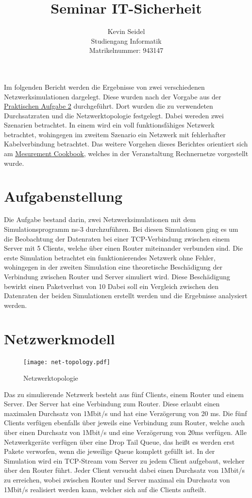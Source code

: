 \documentclass[a4paper, 12pt]{scrartcl}
\title{Seminar IT-Sicherheit}
\author{Kevin Seidel \\ Studiengang Informatik \\ Matrikelnummer: 943147}
\begin{document}
\setcounter{page}{1}

Im folgenden Bericht werden die Ergebnisse von zwei verschiedenen Netzwerksimulationen dargelegt. Diese wurden nach der Vorgabe aus der {\color{blue}\uline{ \href{http://sys.cs.uos.de/lehre/rene/2013/aufgaben/PA_Blatt02.pdf}{Praktischen Aufgabe 2}}} durchgeführt. Dort wurden die zu verwendeten Durchsatzraten und die Netzwerktopologie festgelegt.
Dabei wereden zwei Szenarien betrachtet. In einem wird ein voll funktionsfähiges Netzwerk betrachtet, wohingegen im zweitem Szenario ein Netzwerk mit fehlerhafter Kabelverbindung betrachtet.
Das weitere Vorgehen dieses Berichtes orientiert sich am {\color{blue}\uline{ \href{http://sys.cs.uos.de/lehre/rene/2013/folien/Kap3-Messungen.pdf}{ Mesurement Cookbook}}}, welches in der Veranstaltung Rechnernetze vorgestellt wurde.

\section{Aufgabenstellung}
Die Aufgabe bestand darin, zwei Netzwerksimulationen mit dem Simulationsprogramm ns-3 durchzuführen. Bei diesen Simulationen ging es um die Beobachtung der Datenraten bei einer TCP-Verbindung zwischen einem Server mit 5 Clients, welche über einen Router miteinander verbunden sind.
Die erste Simulation betrachtet ein funktionierendes Netzwerk ohne Fehler, wohingegen in der zweiten Simulation eine theoretische Beschädigung der Verbindung zwischen Router und Server simuliert wird. Diese Beschädigung bewirkt einen Paketverlust von 10%
Dabei soll ein Vergleich zwischen den Datenraten der beiden Simulationen erstellt werden und die Ergebnisse analysiert werden.

\section{Netzwerkmodell}
\begin{figure}[htbp]
	\centering
    \texttt{[image: net-topology.pdf]}
  \caption{Netzwerktopologie}
  \label{Labelname}
\end{figure}
Das zu simulierende Netzwerk besteht aus fünf Clients, einem Router und einem Server. 
Der Server hat eine Verbindung zum Router. Diese erlaubt einen maximalen Durchsatz von 1Mbit/s und hat eine Verzögerung von 20 ms.
Die fünf Clients verfügen ebenfalls über jeweils eine Verbindung zum Router, welche auch über einen Durchsatz von 1Mbit/s und eine Verzögerung von 20ms verfügen.
Alle Netzwerkgeräte verfügen über eine Drop Tail Queue, das heißt es werden erst Pakete verworfen, wenn die jeweilige Queue komplett gefüllt ist.
In der Simulation wird ein TCP-Stream vom Server zu jedem Client aufgebaut, welcher über den Router führt. Jeder Client versucht dabei einen Durchsatz von 1Mbit/s zu erreichen, wobei zwischen Router und Server maximal ein Durchsatz von 1Mbit/s realisiert werden kann, welcher sich auf die Clients aufteilt.
\end{document}
